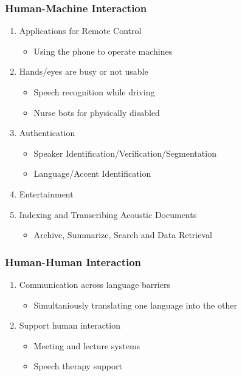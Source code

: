 \documentclass[11pt]{article}
\begin{document}
\subsubsection{Human-Machine Interaction}
\begin{enumerate}
\item Applications for Remote Control
\begin{itemize}
\item Using the phone to operate machines
\end{itemize}

\item Hands/eyes are busy or not usable
\begin{itemize}
\item Speech recognition while driving
\item Nurse bots for physically disabled
\end{itemize}

\item Authentication
\begin{itemize}
\item Speaker Identification/Verification/Segmentation
\item Language/Accent Identification
\end{itemize}

\item Entertainment

\item Indexing and Transcribing Acoustic Documents
\begin{itemize}
\item Archive, Summarize, Search and Data Retrieval
\end{itemize}

\end{enumerate}

\subsubsection{Human-Human Interaction}
\begin{enumerate}
\item Communication across language barriers
\begin{itemize}
\item Simultaniously translating one language into the other
\end{itemize}

\item Support human interaction
\begin{itemize}
\item Meeting and lecture systems
\item Speech therapy support

\end{itemize}


\end{enumerate}
\end{document}
